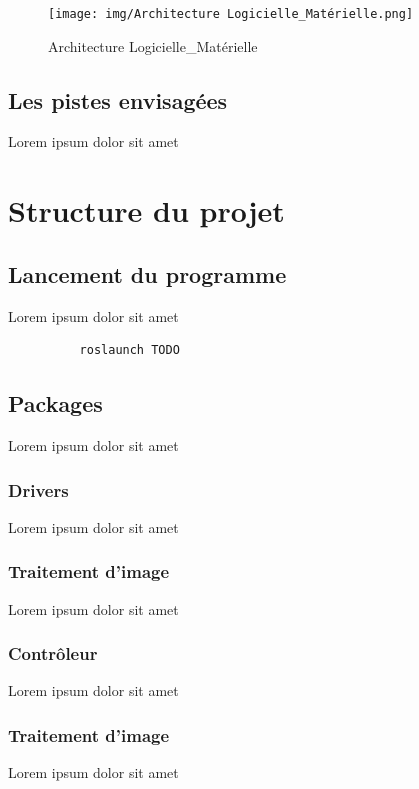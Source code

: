 \documentclass[12pt, openany]{report}
\begin{document}
      \begin{figure}[H]
      \begin{center}
        \hfill \texttt{[image: img/Architecture Logicielle\_Matérielle.png]} \hspace*{\fill}
        \caption[le titre]{Architecture Logicielle_Matérielle}
        \label{monlabel}
      \end{center}
      \end{figure}


\subsection{Les pistes envisagées}
Lorem ipsum dolor sit amet

\section{Structure du projet}
\subsection{Lancement du programme}
Lorem ipsum dolor sit amet

\begin{lstlisting}
          roslaunch TODO
    \end{lstlisting}

\subsection{Packages}
Lorem ipsum dolor sit amet

\subsubsection{Drivers}
Lorem ipsum dolor sit amet

\subsubsection{Traitement d'image}
Lorem ipsum dolor sit amet

\subsubsection{Contrôleur}
Lorem ipsum dolor sit amet

\subsubsection{Traitement d'image}
Lorem ipsum dolor sit amet
\end{document}

